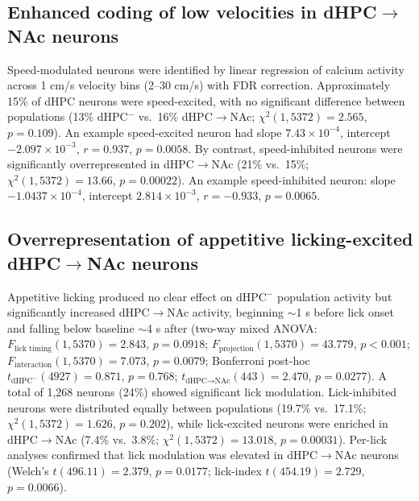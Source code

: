 \documentclass[10pt,a4paper]{article}
\begin{document}
\subsection{Enhanced coding of low velocities in dHPC$\rightarrow$NAc neurons}
Speed-modulated neurons were identified by linear regression of calcium activity across 1 cm/s velocity bins (2--30 cm/s) with FDR correction. Approximately 15\% of dHPC neurons were speed-excited, with no significant difference between populations (13\% dHPC$^{-}$ vs.\ 16\% dHPC$\rightarrow$NAc; $\chi^2(1,5372)=2.565$, $p=0.109$). An example speed-excited neuron had slope $7.43\times10^{-4}$, intercept $-2.097\times10^{-3}$, $r=0.937$, $p=0.0058$. By contrast, speed-inhibited neurons were significantly overrepresented in dHPC$\rightarrow$NAc (21\% vs.\ 15\%; $\chi^2(1,5372)=13.66$, $p=0.00022$). An example speed-inhibited neuron: slope $-1.0437\times10^{-4}$, intercept $2.814\times10^{-3}$, $r=-0.933$, $p=0.0065$.

\subsection{Overrepresentation of appetitive licking-excited dHPC$\rightarrow$NAc neurons}
Appetitive licking produced no clear effect on dHPC$^{-}$ population activity but significantly increased dHPC$\rightarrow$NAc activity, beginning $\sim$1 s before lick onset and falling below baseline $\sim$4 s after (two-way mixed ANOVA: $F_{\text{lick timing}}(1,5370)=2.843$, $p=0.0918$; $F_{\text{projection}}(1,5370)=43.779$, $p<0.001$; $F_{\text{interaction}}(1,5370)=7.073$, $p=0.0079$; Bonferroni post-hoc $t_{\text{dHPC}^{-}}(4927)=0.871$, $p=0.768$; $t_{\text{dHPC}\rightarrow\text{NAc}}(443)=2.470$, $p=0.0277$). A total of 1{,}268 neurons (24\%) showed significant lick modulation. Lick-inhibited neurons were distributed equally between populations (19.7\% vs.\ 17.1\%; $\chi^2(1,5372)=1.626$, $p=0.202$), while lick-excited neurons were enriched in dHPC$\rightarrow$NAc (7.4\% vs.\ 3.8\%; $\chi^2(1,5372)=13.018$, $p=0.00031$). Per-lick analyses confirmed that lick modulation was elevated in dHPC$\rightarrow$NAc neurons (Welch's $t(496.11)=2.379$, $p=0.0177$; lick-index $t(454.19)=2.729$, $p=0.0066$).
\end{document}
